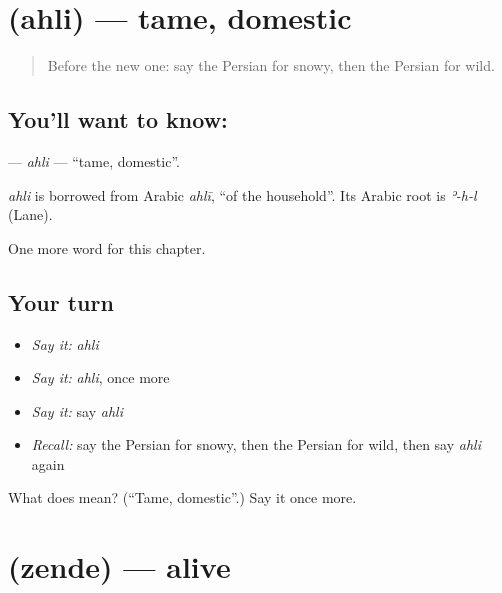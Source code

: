 \section[\texorpdfstring{\fa{اهلی} (ahli)}{اهلی (ahli)}]{ (ahli) — tame, domestic}

\label{lesson:FA-C237-ahli}



\begin{quote}
Before the new one: say the Persian for snowy, then the Persian for wild.
\end{quote}

\subsection*{You'll want to know: }
\textbf{} — \emph{ahli} — \textquotedblleft{}tame, domestic\textquotedblright{}.

\begin{cousinweb}
\emph{ahli} is borrowed from Arabic \emph{ahlī}, \textquotedblleft{}of the household\textquotedblright{}. Its Arabic root is \emph{ʾ-h-l} (Lane).
\end{cousinweb}

\begin{grammarlens}[title={What you've built}]
One more word for this chapter.
\end{grammarlens}

\subsection*{Your turn}
\begin{itemize}
\raggedright
  \item \emph{Say it:} \emph{ahli}
  \item \emph{Say it:} \emph{ahli}, once more
  \item \emph{Say it:} say \emph{ahli}
  \item \emph{Recall:} say the Persian for snowy, then the Persian for wild, then say \emph{ahli} again
\end{itemize}

\begin{tcolorbox}[breakable,colback=teal!4,colframe=teal!35!black,title={Before you move on}]
What does  mean? (\textquotedblleft{}Tame, domestic\textquotedblright{}.) Say it once more.
\end{tcolorbox}
\section[\texorpdfstring{\fa{زنده} (zende)}{زنده (zende)}]{ (zende) — alive}

